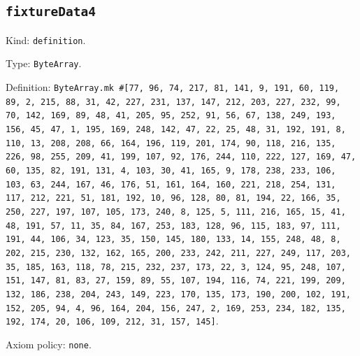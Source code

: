 \documentclass[11pt]{article}
\begin{document}
\subsection*{\texttt{fixtureData4}}
\noindent Kind: \texttt{definition}.\par
\noindent Type: \texttt{ByteArray}.\par
\noindent Definition: \texttt{ByteArray.mk \#[77, 96, 74, 217, 81, 141, 9, 191, 60, 119, 89, 2, 215, 88, 31, 42, 227, 231, 137, 147, 212, 203, 227, 232, 99, 70, 142, 169, 89, 48, 41, 205, 95, 252, 91, 56, 67, 138, 249, 193, 156, 45, 47, 1, 195, 169, 248, 142, 47, 22, 25, 48, 31, 192, 191, 8, 110, 13, 208, 208, 66, 164, 196, 119, 201, 174, 90, 118, 216, 135, 226, 98, 255, 209, 41, 199, 107, 92, 176, 244, 110, 222, 127, 169, 47, 60, 135, 82, 191, 131, 4, 103, 30, 41, 165, 9, 178, 238, 233, 106, 103, 63, 244, 167, 46, 176, 51, 161, 164, 160, 221, 218, 254, 131, 117, 212, 221, 51, 181, 192, 10, 96, 128, 80, 81, 194, 22, 166, 35, 250, 227, 197, 107, 105, 173, 240, 8, 125, 5, 111, 216, 165, 15, 41, 48, 191, 57, 11, 35, 84, 167, 253, 183, 128, 96, 115, 183, 97, 111, 191, 44, 106, 34, 123, 35, 150, 145, 180, 133, 14, 155, 248, 48, 8, 202, 215, 230, 132, 162, 165, 200, 233, 242, 211, 227, 249, 117, 203, 35, 185, 163, 118, 78, 215, 232, 237, 173, 22, 3, 124, 95, 248, 107, 151, 147, 81, 83, 27, 159, 89, 55, 107, 194, 116, 74, 221, 199, 209, 132, 186, 238, 204, 243, 149, 223, 170, 135, 173, 190, 200, 102, 191, 152, 205, 94, 4, 96, 164, 204, 156, 247, 2, 169, 253, 234, 182, 135, 192, 174, 20, 106, 109, 212, 31, 157, 145]}.\par
\noindent Axiom policy: \texttt{none}.\par
\end{document}
